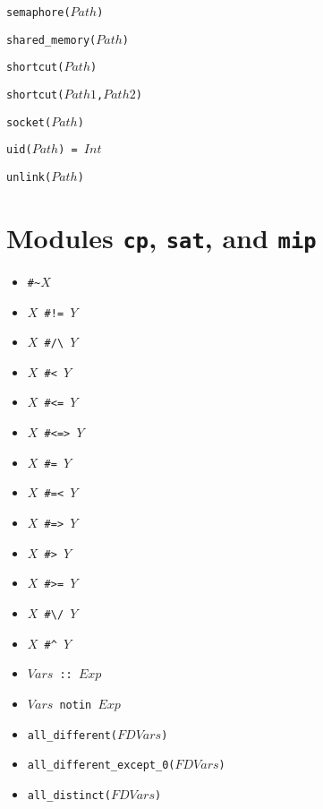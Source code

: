 \documentclass[10pt]{article}
\begin{document}
\begin{multicols}{2}
\begin{scriptsize}
\begin{itemize}
{\item \texttt{semaphore($Path$)}
\item \texttt{shared\_memory($Path$)}
\item \texttt{shortcut($Path$)}
\item \texttt{shortcut($Path1$,$Path2$)}
\item \texttt{socket($Path$)}
\item \texttt{uid($Path$) = $Int$}
\item \texttt{unlink($Path$)}
}
\end{itemize}
\end{scriptsize}

\section*{Modules \texttt{cp}, \texttt{sat}, and \texttt{mip}}
\begin{scriptsize}
\begin{itemize}
    \item {\tt \verb+#~+$X$}
    \item {\tt $X$ \verb+#!=+ $Y$} 
    \item {\tt $X$ \verb+#/\+ $Y$}
    \item {\tt $X$ \verb+#<+ $Y$} 
    \item {\tt $X$ \verb+#<=+ $Y$}
    \item {\tt $X$ \verb+#<=>+ $Y$}
    \item {\tt $X$ \verb+#=+ $Y$} 
    \item {\tt $X$ \verb+#=<+ $Y$} 
    \item {\tt $X$ \verb+#=>+ $Y$}
    \item {\tt $X$ \verb+#>+ $Y$} 
    \item {\tt $X$ \verb+#>=+ $Y$} 
    \item {\tt $X$ \verb+#\/+ $Y$}
    \item {\tt $X$ \verb+#^+ $Y$}
\item \texttt{$Vars$ :: $Exp$}
\item \texttt{$Vars$ notin $Exp$}
\item \texttt{all\_different($FDVars$)}
\item \texttt{all\_different\_except\_0($FDVars$)}
\item \texttt{all\_distinct($FDVars$)}

\end{itemize}
\end{scriptsize}
\end{multicols}
\end{document}
